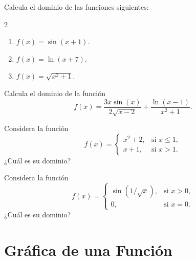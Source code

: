 \documentclass[12pt,a4paper]{book}
\begin{document}
    \begin{ejercicio}\label{ej:90}
        Calcula el dominio de las funciones siguientes:
        \begin{multicols}{2}
        \begin{enumerate}[nosep]
            \item $f(x)=\sin(x+1)$.
            \item $f(x)=\ln(x+7)$.
            \item $f(x)=\sqrt{x^{2}+1}$.
        \end{enumerate}
        \end{multicols}
    \end{ejercicio}

    \begin{ejercicio}\label{ej:91}
        Calcula el dominio de la función
        \begin{equation*}
            f(x)=\frac{3x\sin(x)}{2\sqrt{x-2}}+\frac{\ln(x-1)}{x^{2}+1}.
        \end{equation*}
    \end{ejercicio}

    \begin{ejercicio}\label{ej:92}
        Considera la función
        \begin{equation*}
            f(x)=\begin{cases}
                x^{2}+2, & \text{si }x\leq 1,\\
                x+1, & \text{si }x>1.
            \end{cases}
        \end{equation*}
        ¿Cuál es su dominio?
    \end{ejercicio}

    \begin{ejercicio}\label{ej:93}
        Considera la función
        \begin{equation*}
            f(x)=\begin{cases}
                \sin\left(1/\sqrt{x}\right), & \text{si }x>0,\\
                0, & \text{si }x=0.
            \end{cases}
        \end{equation*}
        ¿Cuál es su dominio?
    \end{ejercicio}

    \section{Gráfica de una Función}
\end{document}
